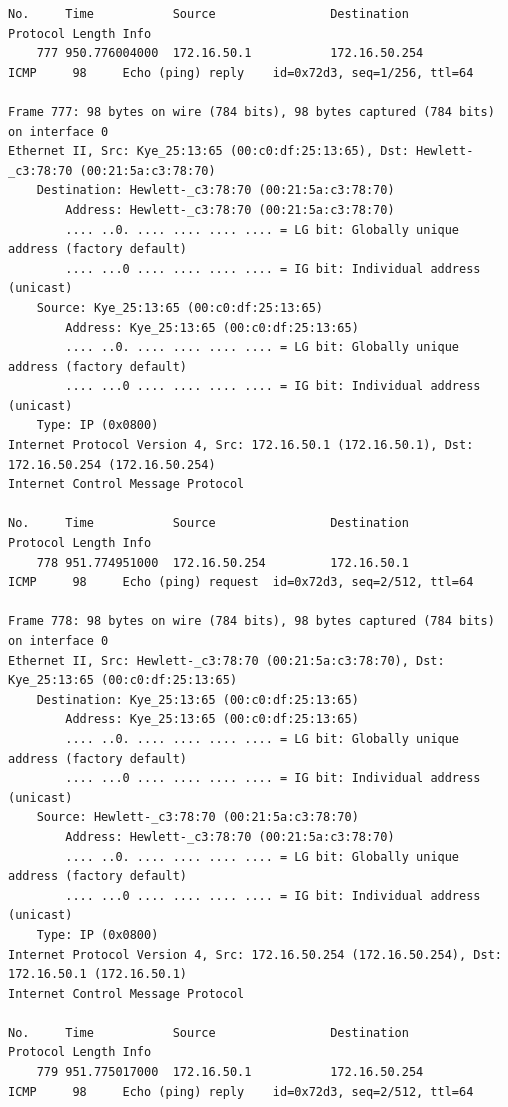 \documentclass[a4paper,11pt]{article}
\begin{document}
\begin{lstlisting}
No.     Time           Source                Destination           Protocol Length Info
    777 950.776004000  172.16.50.1           172.16.50.254         ICMP     98     Echo (ping) reply    id=0x72d3, seq=1/256, ttl=64

Frame 777: 98 bytes on wire (784 bits), 98 bytes captured (784 bits) on interface 0
Ethernet II, Src: Kye_25:13:65 (00:c0:df:25:13:65), Dst: Hewlett-_c3:78:70 (00:21:5a:c3:78:70)
    Destination: Hewlett-_c3:78:70 (00:21:5a:c3:78:70)
        Address: Hewlett-_c3:78:70 (00:21:5a:c3:78:70)
        .... ..0. .... .... .... .... = LG bit: Globally unique address (factory default)
        .... ...0 .... .... .... .... = IG bit: Individual address (unicast)
    Source: Kye_25:13:65 (00:c0:df:25:13:65)
        Address: Kye_25:13:65 (00:c0:df:25:13:65)
        .... ..0. .... .... .... .... = LG bit: Globally unique address (factory default)
        .... ...0 .... .... .... .... = IG bit: Individual address (unicast)
    Type: IP (0x0800)
Internet Protocol Version 4, Src: 172.16.50.1 (172.16.50.1), Dst: 172.16.50.254 (172.16.50.254)
Internet Control Message Protocol

No.     Time           Source                Destination           Protocol Length Info
    778 951.774951000  172.16.50.254         172.16.50.1           ICMP     98     Echo (ping) request  id=0x72d3, seq=2/512, ttl=64

Frame 778: 98 bytes on wire (784 bits), 98 bytes captured (784 bits) on interface 0
Ethernet II, Src: Hewlett-_c3:78:70 (00:21:5a:c3:78:70), Dst: Kye_25:13:65 (00:c0:df:25:13:65)
    Destination: Kye_25:13:65 (00:c0:df:25:13:65)
        Address: Kye_25:13:65 (00:c0:df:25:13:65)
        .... ..0. .... .... .... .... = LG bit: Globally unique address (factory default)
        .... ...0 .... .... .... .... = IG bit: Individual address (unicast)
    Source: Hewlett-_c3:78:70 (00:21:5a:c3:78:70)
        Address: Hewlett-_c3:78:70 (00:21:5a:c3:78:70)
        .... ..0. .... .... .... .... = LG bit: Globally unique address (factory default)
        .... ...0 .... .... .... .... = IG bit: Individual address (unicast)
    Type: IP (0x0800)
Internet Protocol Version 4, Src: 172.16.50.254 (172.16.50.254), Dst: 172.16.50.1 (172.16.50.1)
Internet Control Message Protocol

No.     Time           Source                Destination           Protocol Length Info
    779 951.775017000  172.16.50.1           172.16.50.254         ICMP     98     Echo (ping) reply    id=0x72d3, seq=2/512, ttl=64


\end{lstlisting}
\end{document}
